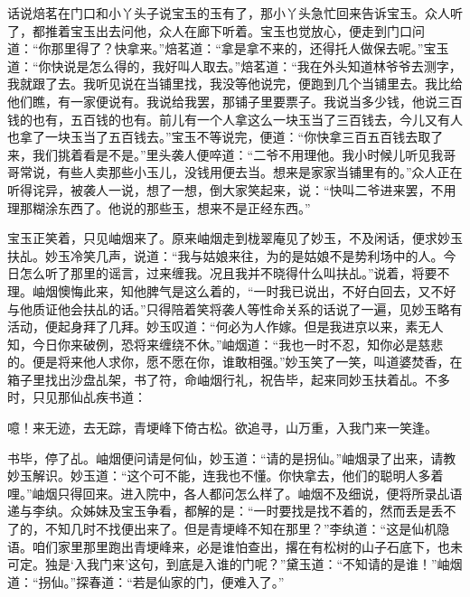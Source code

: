 


\begin{parag}
    话说焙茗在门口和小丫头子说宝玉的玉有了，那小丫头急忙回来告诉宝玉。众人听了，都推着宝玉出去问他，众人在廊下听着。宝玉也觉放心，便走到门口问道：“你那里得了？快拿来。”焙茗道：“拿是拿不来的，还得托人做保去呢。”宝玉道：“你快说是怎么得的，我好叫人取去。”焙茗道：“我在外头知道林爷爷去测字，我就跟了去。我听见说在当铺里找，我没等他说完，便跑到几个当铺里去。我比给他们瞧，有一家便说有。我说给我罢，那铺子里要票子。我说当多少钱，他说三百钱的也有，五百钱的也有。前儿有一个人拿这么一块玉当了三百钱去，今儿又有人也拿了一块玉当了五百钱去。”宝玉不等说完，便道：“你快拿三百五百钱去取了来，我们挑着看是不是。”里头袭人便啐道：“二爷不用理他。我小时候儿听见我哥哥常说，有些人卖那些小玉儿，没钱用便去当。想来是家家当铺里有的。”众人正在听得诧异，被袭人一说，想了一想，倒大家笑起来，说：“快叫二爷进来罢，不用理那糊涂东西了。他说的那些玉，想来不是正经东西。”
\end{parag}


\begin{parag}
    宝玉正笑着，只见岫烟来了。原来岫烟走到栊翠庵见了妙玉，不及闲话，便求妙玉扶乩。妙玉冷笑几声，说道：“我与姑娘来往，为的是姑娘不是势利场中的人。今日怎么听了那里的谣言，过来缠我。况且我并不晓得什么叫扶乩。”说着，将要不理。岫烟懊悔此来，知他脾气是这么着的，“一时我已说出，不好白回去，又不好与他质证他会扶乩的话。”只得陪着笑将袭人等性命关系的话说了一遍，见妙玉略有活动，便起身拜了几拜。妙玉叹道：“何必为人作嫁。但是我进京以来，素无人知，今日你来破例，恐将来缠绕不休。”岫烟道：“我也一时不忍，知你必是慈悲的。便是将来他人求你，愿不愿在你，谁敢相强。”妙玉笑了一笑，叫道婆焚香，在箱子里找出沙盘乩架，书了符，命岫烟行礼，祝告毕，起来同妙玉扶着乩。不多时，只见那仙乩疾书道：
\end{parag}


\begin{qute2sp}
    噫！来无迹，去无踪，青埂峰下倚古松。欲追寻，山万重，入我门来一笑逢。
\end{qute2sp}


\begin{parag}
    书毕，停了乩。岫烟便问请是何仙，妙玉道：“请的是拐仙。”岫烟录了出来，请教妙玉解识。妙玉道：“这个可不能，连我也不懂。你快拿去，他们的聪明人多着哩。”岫烟只得回来。进入院中，各人都问怎么样了。岫烟不及细说，便将所录乩语递与李纨。众姊妹及宝玉争看，都解的是：“一时要找是找不着的，然而丢是丢不了的，不知几时不找便出来了。但是青埂峰不知在那里？”李纨道：“这是仙机隐语。咱们家里那里跑出青埂峰来，必是谁怕查出，撂在有松树的山子石底下，也未可定。独是‘入我门来’这句，到底是入谁的门呢？”黛玉道：“不知请的是谁！”岫烟道：“拐仙。”探春道：“若是仙家的门，便难入了。”
\end{parag}


